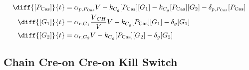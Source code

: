 \begin{align}
\diff{\conc{\proSp{\cas{}}}}{t} & =  \txtlRate{\proSp{\cas{}}}\vectorGen{} - \gRnaBind{}\conc{\proSp{\cas{}}}\conc{\gRna{1}} - \gRnaBind{}\conc{\proSp{\cas{}}}\conc{\gRna{2}} - \proDegradeRate{\proSp{\cas{}}}\conc{\proSp{\cas{}}}\\
\diff{\conc{\gRna{1}}}{t} & =  \txRate{\gRna{1}}\frac{\vectorGen{}_{CH}}{\vectorGen{}}\vectorGen{} - \gRnaBind{}\conc{\proSp{\cas{}}}\conc{\gRna{1}} - \rnaDegradeRate{}\conc{\gRna{1}}\\
\diff{\conc{\gRna{2}}}{t} & =  \txRate{\gRna{2}}\vectorGen{} - \gRnaBind{}\conc{\proSp{\cas{}}}\conc{\gRna{2}} - \rnaDegradeRate{}\conc{\gRna{2}}
\end{align}

\subsection{Chain Cre-on Cre-on Kill Switch}
\label{s:Chain_Cre_on_Cre_on_Kill_Switch}

